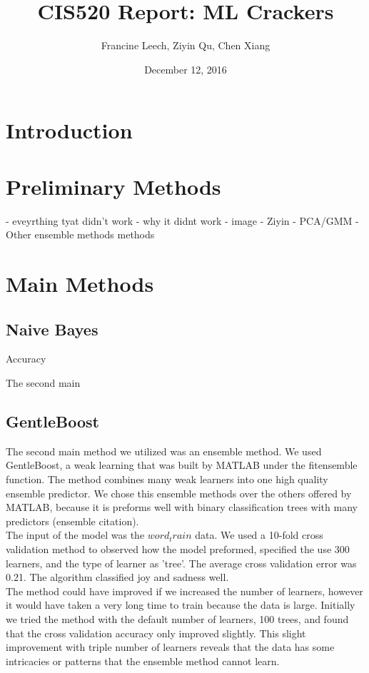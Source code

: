 \documentclass[]{article}
\begin{document}
\title{CIS520 Report: ML Crackers}   %
\author{Francine Leech, Ziyin Qu, Chen Xiang}         %
\date{December 12, 2016}    %
\maketitle

\section{Introduction}


\section{Preliminary Methods}
- eveyrthing tyat didn't work
- why it didnt work 
- image - Ziyin
- PCA/GMM 
- Other ensemble methods methods


\section{Main Methods}

\subsection{Naive Bayes}
Accuracy

The second main

\subsection{GentleBoost}
The second main method we utilized was an ensemble method. We used GentleBoost, a weak learning that was built by MATLAB under the fitensemble function. The method combines many weak learners into one high quality ensemble predictor. We chose this ensemble methods over the others offered by MATLAB, because it is preforms well with binary classification trees with many predictors (ensemble citation). \\

The input of the model was the $word_train$ data. We used a 10-fold cross validation method to observed how the model preformed, specified the use 300 learners, and the type of learner as 'tree'. The average cross validation error was 0.21. The algorithm classified joy and sadness well. \\

The method could have improved if we increased the number of learners, however it would have taken a very long time to train because the data is large. Initially we tried the method with the default number of learners, 100 trees, and found that the cross validation accuracy only improved slightly. This slight improvement with triple number of learners reveals that the data has some intricacies or patterns that the ensemble method cannot learn.   
\end{document}
